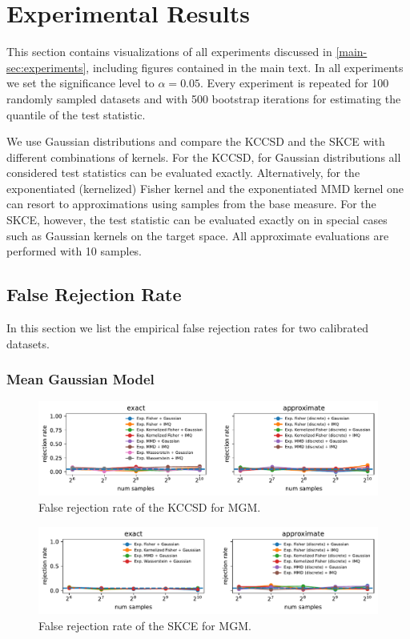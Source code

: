 \documentclass{uai2023} %
\begin{document}
\section{Experimental Results}

This section contains visualizations of all experiments discussed in \cref{main-sec:experiments}, including figures contained in the main text.
In all experiments we set the significance level to $\alpha = 0.05$.
Every experiment is repeated for 100 randomly sampled datasets and with 500 bootstrap iterations for estimating the quantile of the test statistic.

We use Gaussian distributions and compare the KCCSD and the SKCE with different combinations of kernels.
For the KCCSD, for Gaussian distributions all considered test statistics can be evaluated exactly.
Alternatively, for the exponentiated (kernelized) Fisher kernel and the exponentiated MMD kernel one can resort to approximations using samples from the base measure.
For the SKCE, however, the test statistic can be evaluated exactly on in special cases such as Gaussian kernels on the target space.
All approximate evaluations are performed with 10 samples.

\subsection{False Rejection Rate}

In this section we list the empirical false rejection rates for two calibrated datasets.

\subsubsection{Mean Gaussian Model}

\begin{figure}[!htb]
    \centering
    \includegraphics[width=\linewidth]{paper/figures/mgm_kccsd.pdf}
    \caption{False rejection rate of the KCCSD for MGM.}
\end{figure}

\begin{figure}[!htb]
    \centering
    \includegraphics[width=\linewidth]{paper/figures/mgm_skce.pdf}
    \caption{False rejection rate of the SKCE for MGM.}
    \label{fig:mgm_skce}
\end{figure}
\end{document}
